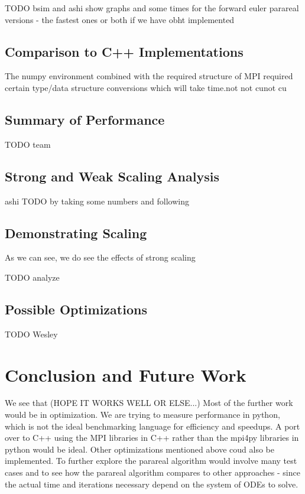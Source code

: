 \documentclass[letterpaper,twocolumn,11pt]{article}
\begin{document}
TODO bsim and ashi show graphs and some times for the forward euler parareal versions - the fastest ones or both if we have obht implemented

\subsection{Comparison to C++ Implementations}
	The numpy environment combined with the required structure of MPI required certain type/data structure conversions which will take time.not not cunot cu

\subsection{Summary of Performance}

TODO team

\subsection{Strong and Weak Scaling Analysis}

ashi TODO by taking some numbers and following %

\subsection{Demonstrating Scaling}

As we can see, we do see the effects of strong scaling

TODO analyze

\subsection{Possible Optimizations}

TODO Wesley

\section{Conclusion and Future Work}

We see that (HOPE IT WORKS WELL OR ELSE...)
Most of the further work would be in optimization.  We are trying to measure performance in python, which is not the ideal benchmarking language for efficiency and speedups.  A port over to C++ using the MPI libraries in C++ rather than the mpi4py libraries in python would be ideal.  Other optimizations mentioned above coud also be implemented.  To further explore the parareal algorithm would involve many test cases and to see how the parareal algorithm compares to other approaches - since the actual time and iterations necessary depend on the system of ODEs to solve.
\end{document}
